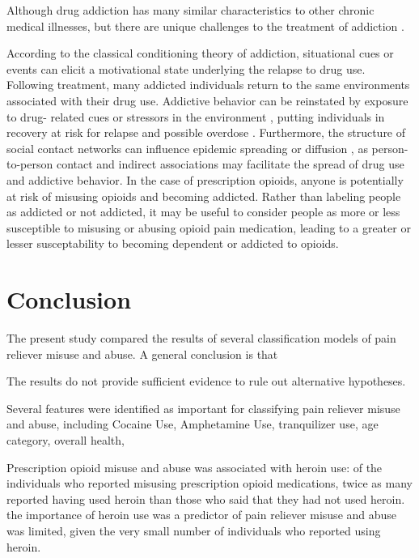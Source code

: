 \documentclass[sigconf]{acmart}
\begin{document}
Although drug addiction has many similar characteristics 
to other chronic medical illnesses, but there are unique challenges to the 
treatment of addiction \cite{marsch12, swendson16}. 

According to the classical 
conditioning theory of addiction, situational cues or events can elicit a 
motivational state underlying the relapse to drug use. Following treatment, 
many addicted individuals return to the same environments associated with 
their drug use. Addictive behavior can be reinstated by exposure to drug-
related cues or stressors in the environment \cite{shaham03}, putting
individuals in recovery at risk for relapse and possible overdose \cite{johnson11}. 
Furthermore, the structure of social contact networks can influence epidemic 
spreading or diffusion \cite{pastor01, watts98}, as person-to-person contact 
and indirect associations may facilitate the spread of drug use and addictive 
behavior. In the case of prescription opioids, anyone is potentially at 
risk of misusing opioids and becoming addicted. Rather than labeling people 
as addicted or not addicted, it may be useful to consider people as more or 
less susceptible to misusing or abusing opioid pain medication, leading to
a greater or lesser susceptability to becoming dependent or addicted to 
opioids. 

\section{Conclusion}

The present study compared the results of several classification models of 
pain reliever misuse and abuse. A general conclusion is that 

The results do not provide sufficient evidence to rule out alternative hypotheses. 

Several features were identified as important for classifying pain reliever
misuse and abuse, including Cocaine Use, Amphetamine Use, tranquilizer use,
age category, overall health,

Prescription opioid misuse and abuse was associated with heroin use: of 
the individuals who reported misusing prescription opioid medications, twice 
as many reported having used heroin than those who said that they had not used 
heroin. the importance of heroin use was a predictor of pain reliever misuse and
abuse was limited, given the very small number of individuals who reported 
using heroin.
\end{document}
